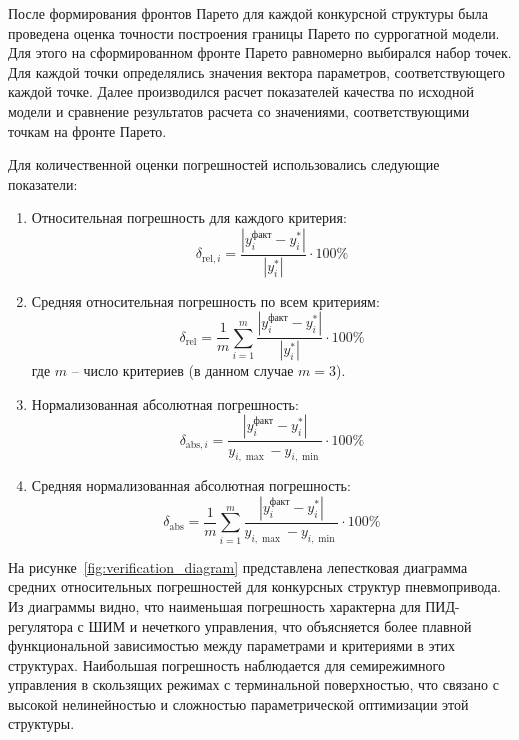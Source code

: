 После формирования фронтов Парето для каждой конкурсной структуры
была проведена оценка точности построения границы Парето по суррогатной
модели. Для этого на сформированном фронте Парето равномерно выбирался
набор точек. Для каждой точки определялись значения вектора параметров,
соответствующего каждой точке. Далее производился расчет показателей качества
по исходной модели и сравнение результатов расчета со значениями,
соответствующими точкам на фронте Парето. 

Для количественной оценки погрешностей использовались следующие показатели:
\begin{enumerate}
	\item Относительная погрешность для каждого критерия:
	      \begin{equation}\label{eq:relative_error}
		      \delta_{\text{rel},i} = \frac{|y_i^{\text{факт}} - y_i^*|}{|y_i^*|} \cdot 100\%
	      \end{equation}

	\item Средняя относительная погрешность по всем критериям:
	      \begin{equation}\label{eq:mean_relative_error}
		      \delta_{\text{rel}} = \frac{1}{m} \sum_{i=1}^{m} \frac{|y_i^{\text{факт}} - y_i^*|}{|y_i^*|} \cdot 100\%
	      \end{equation}
	      где $m$ -- число критериев (в данном случае $m = 3$).

	\item Нормализованная абсолютная погрешность:
	      \begin{equation}\label{eq:normalized_absolute_error}
		      \delta_{\text{abs},i} = \frac{|y_i^{\text{факт}} - y_i^*|}{y_{i,\max} - y_{i,\min}} \cdot 100\%
	      \end{equation}

	\item Средняя нормализованная абсолютная погрешность:
	      \begin{equation}\label{eq:mean_normalized_absolute_error}
		      \delta_{\text{abs}} = \frac{1}{m} \sum_{i=1}^{m} \frac{|y_i^{\text{факт}} - y_i^*|}{y_{i,\max} - y_{i,\min}} \cdot 100\%
	      \end{equation}
\end{enumerate}

На рисунке~\ref{fig:verification_diagram} представлена лепестковая диаграмма
средних относительных погрешностей для конкурсных структур пневмопривода.
Из диаграммы видно, что наименьшая погрешность характерна для ПИД-регулятора с
ШИМ и нечеткого управления, что объясняется более плавной функциональной зависимостью
между параметрами и критериями в этих структурах. Наибольшая погрешность наблюдается
для семирежимного управления в скользящих режимах с терминальной поверхностью, что
связано с высокой нелинейностью и сложностью параметрической оптимизации этой структуры.

